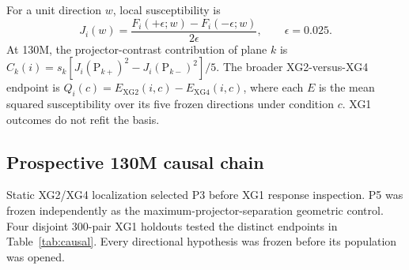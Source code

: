 For a unit direction $w$, local susceptibility is
\begin{equation}
J_i(w)=\frac{F_i(+\epsilon;w)-F_i(-\epsilon;w)}{2\epsilon},
\qquad \epsilon=0.025.
\label{eq:susc}
\end{equation}
At 130M, the projector-contrast contribution of plane $k$ is
$C_k(i)=s_k[J_i(\mathrm{P}_{k+})^2-J_i(\mathrm{P}_{k-})^2]/5$.
The broader XG2-versus-XG4 endpoint is
$Q_i(c)=E_{\mathrm{XG2}}(i,c)-E_{\mathrm{XG4}}(i,c)$,
where each $E$ is the mean squared susceptibility over its five frozen directions under condition $c$. XG1 outcomes do not refit the basis.

\subsection{Prospective 130M causal chain}
\label{app:causal}

Static XG2/XG4 localization selected P3 before XG1 response inspection.
P5 was frozen independently as the maximum-projector-separation geometric
control. Four disjoint 300-pair XG1 holdouts tested the distinct endpoints
in Table~\ref{tab:causal}. Every directional hypothesis was frozen before
its population was opened.

\begin{table}[h]
\centering\small
\caption{Frozen 130M paired-item tests. Endpoint magnitudes are not
interchangeable effect sizes.}
\label{tab:causal}
\end{table}

